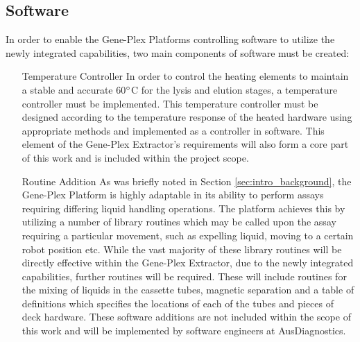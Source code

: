 \subsection{Software}
\label{sec:intro_software}
In order to enable the Gene-Plex Platforms controlling software to utilize the newly integrated capabilities, two main components of software must be created:
\begin{enumerate}
	\item[Temperature Controller] In order to control the heating elements to maintain a stable and accurate 60$\degree$C for the lysis and elution stages, a temperature controller must be implemented. This temperature controller must be designed according to the temperature response of the heated hardware using appropriate methods and implemented as a controller in software. This element of the Gene-Plex Extractor's requirements will also form a core part of this work and is included within the project scope.
	\item [Routine Addition] As was briefly noted in Section \ref{sec:intro_background}, the Gene-Plex Platform is highly adaptable in its ability to perform assays requiring differing liquid handling operations. The platform achieves this by utilizing a number of library routines which may be called upon the assay requiring a particular movement, such as expelling liquid, moving to a certain robot position etc. While the vast majority of these library routines will be directly effective within the Gene-Plex Extractor, due to the newly integrated capabilities, further routines will be required. These will include routines for the mixing of liquids in the cassette tubes, magnetic separation and a table of definitions which specifies the locations of each of the tubes and pieces of deck hardware. These software additions are not included within the scope of this work and will be implemented by software engineers at AusDiagnostics.
\end{enumerate}